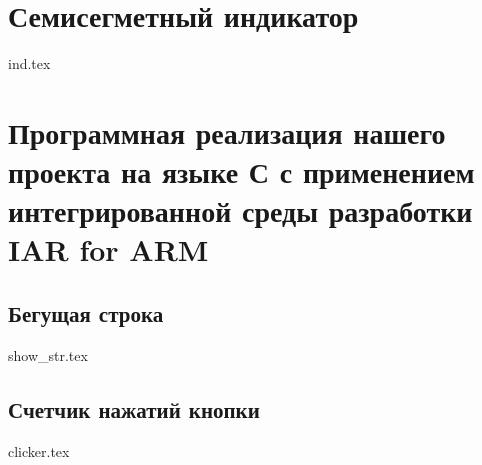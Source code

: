 \documentclass[15pt,a5paper,reqno]{article}
\begin{document}
\newpage

\section{Семисегметный индикатор}

{ind.tex}

\newpage

\section{Программная реализация нашего проекта на языке С с применением
         интегрированной среды разработки IAR for ARM}

\subsection{Бегущая строка}

{show_str.tex}

\newpage

\subsection{Счетчик нажатий кнопки}

{clicker.tex}
\end{document}

